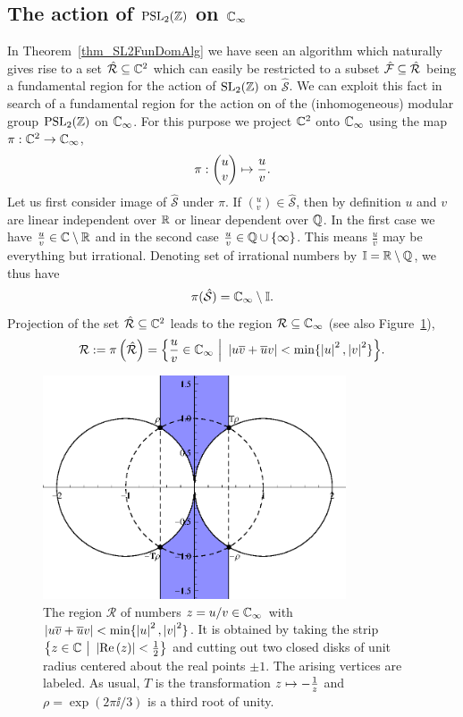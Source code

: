 \subsection{The action of $\operatorname{PSL}_{2}(\mathbb{Z})$ on $\mathbb{C}_{\infty}$}

In Theorem~\ref{thm_SL2FunDomAlg} we have seen an algorithm which naturally gives rise to a set $\hat{\mathcal{R}} \subseteq \mathbb{C}^2$ which can easily be restricted to a subset $\hat{\mathcal{F}} \subseteq \hat{\mathcal{R}}$ being a fundamental region for the action of $\operatorname{SL}_{2}(\mathbb{Z})$ on $\hat{\mathcal{S}}$. We can exploit this fact in search of a fundamental region for the action on of the (inhomogeneous) modular group $\operatorname{PSL}_{2}(\mathbb{Z})$ on $\mathbb{C}_{\infty}$. For this purpose we project $\mathbb{C}^2$ onto $\mathbb{C}_{\infty}$ using the map $\pi : \mathbb{C}^2 \to \mathbb{C}_{\infty}$,
\begin{equation}
\pi : \begin{pmatrix}u \\ v\end{pmatrix} \mapsto \frac{u}{v}.
\end{equation}
Let us first consider image of $\hat{\mathcal{S}}$ under $\pi$. If $({}^u_v) \in \hat{\mathcal{S}}$, then by definition $u$ and $v$ are linear independent over $\mathbb{R}$ or linear dependent over $\mathbb{Q}$. In the first case we have $\frac{u}{v} \in \mathbb{C} \setminus \mathbb{R}$ and in the second case $\frac{u}{v} \in \mathbb{Q} \cup \{\infty\}$. This means $\frac{u}{v}$ may be everything but irrational. Denoting set of irrational numbers by $\mathbb{I} = \mathbb{R} \setminus \mathbb{Q}$, we thus have
\begin{equation*}
\pi(\hat{\mathcal{S}}) = \mathbb{C}_{\infty} \setminus \mathbb{I}.
\end{equation*}
Projection of the set $\hat{\mathcal{R}} \subseteq \mathbb{C}^2$ leads to the region $\mathcal{R} \subseteq \mathbb{C}_{\infty}$ (see also Figure~\ref{fig_PSL2MinRegion}),
\begin{equation}
\label{eqn_PSL2MinRegion}
\mathcal{R} := \pi\left(\hat{\mathcal{R}}\right) = 
\Big\{ \frac{u}{v} \in \mathbb{C}_{\infty} \ \Big| \ \left|u\overline{v} + \overline{u}v\right| < \min\{\left|u\right|^2, \left|v\right|^2\} \Big\}.
\end{equation}
\begin{figure}
\centering
\includegraphics[width=0.8\textwidth]{figures/minimal-region}
\caption{The region $\mathcal{R}$ of numbers $z = u/v \in \mathbb{C}_{\infty}$ with $\left|u\overline{v} + \overline{u}v\right| < \min\{\left|u\right|^2,\left|v\right|^2\}$. It is obtained by taking the strip $\big\{ z \in \mathbb{C} \ \big| \ \left|\operatorname{Re}\left(z\right)\right| < \frac{1}{2} \big\}$  and cutting out two closed disks of unit radius centered about the real points $\pm 1$. The arising vertices are labeled. As usual, $T$ is the transformation $z \mapsto -\frac{1}{z}$ and $\rho = \exp(2 \pi \ii / 3)$ is a third root of unity.}
\label{fig_PSL2MinRegion}
\end{figure}
